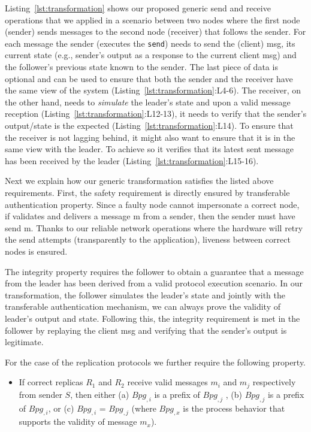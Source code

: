 Listing~\ref{lst:transformation} shows our proposed generic send and receive operations that we applied in a scenario between two nodes where the first node (sender) sends messages to the second node (receiver) that follows the sender. For each message the sender (executes the {\tt send}) needs to send the (client) msg, its current state (e.g., sender's output as a response to the current client msg) and  the follower's previous state known to the sender. The last piece of data is optional and can be used to ensure that both the sender and the receiver have the same view of the system (Listing~\ref{lst:transformation}:L4-6). The receiver, on the other hand, needs to {\em simulate} the leader's state and upon a valid message reception (Listing~\ref{lst:transformation}:L12-13), it needs to verify that the sender's output/state is the expected (Listing~\ref{lst:transformation}:L14). To ensure that the receiver is not lagging behind, it might also want to ensure that it is in the same view with the leader. To achieve so it verifies that its latest sent message has been received by the leader (Listing~\ref{lst:transformation}:L15-16).

 Next we explain how our generic transformation satisfies the listed above requirements. First, the safety requirement is directly ensured by \projecttitle{} transferable authentication property. Since a faulty node cannot impersonate a correct node, if \projecttitle{} validates and delivers a message m from a sender, then the sender must have send m. Thanks to our  reliable network operations where the \projecttitle{} hardware will retry the send attempts (transparently to the application), liveness between correct nodes is ensured. 

The integrity property requires the follower to obtain a guarantee that a message from the leader has been derived from a valid protocol execution scenario. In our transformation, the follower simulates the leader's state and jointly with the transferable authentication mechanism, we can always prove the validity of leader's output and state. Following this, the integrity requirement is met in the follower by replaying the client msg and verifying that the sender's output is legitimate.

For the case of the replication protocols we further require the following property.
\begin{itemize}
\item {} If correct replicas $R_1$ and $R_2$ receive valid messages $m_i$ and $m_j$  respectively from sender $S$, then either (a) $Bpg_{,i}$ is a prefix of $Bpg_{,j}$ , (b) $Bpg_{,j}$ is a prefix of $Bpg_{,i}$, or (c) $Bpg_{,i}$ = $Bpg_{,j}$ (where $Bpg_{,x}$ is the process behavior that supports the validity of message $m_x$).
\end{itemize}

